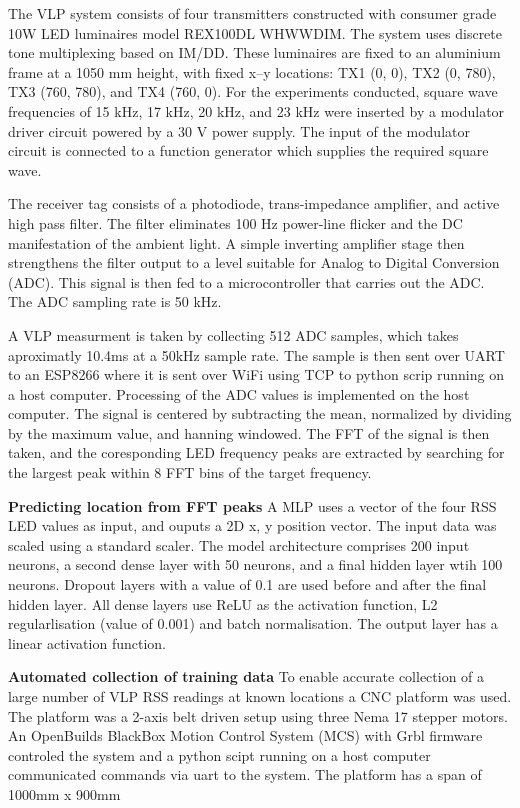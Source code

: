 The VLP system consists of four transmitters constructed with consumer grade 10W LED luminaires model REX100DL WHWWDIM. 
The system uses discrete tone multiplexing based on IM/DD.
These luminaires are fixed to an aluminium frame at a 1050 mm height, with fixed x–y locations: TX1 (0, 0), TX2 (0, 780), TX3 (760, 780), and TX4 (760, 0).
For the experiments conducted, square wave frequencies of 15 kHz, 17 kHz, 20 kHz, and 23 kHz were inserted by a modulator driver circuit powered by a 30 V power supply. 
The input of the modulator circuit is connected to a function generator which supplies the required square wave. 


The receiver tag consists of a photodiode, trans-impedance amplifier, and active high pass filter. 
The filter eliminates 100 Hz power-line flicker and the DC manifestation of the ambient light. 
A simple inverting amplifier stage then strengthens the filter output to a level suitable for Analog to Digital Conversion (ADC). 
This signal is then fed to a microcontroller that carries out the ADC. 
The ADC sampling rate is 50 kHz.

A VLP measurment is taken by collecting 512 ADC samples, which takes aproximatly 10.4ms at a 50kHz sample rate. 
The sample is then sent over UART to an ESP8266 where it is sent over WiFi using TCP to python scrip running on a host computer.
Processing of the ADC values is implemented on the host computer.
The signal is centered by subtracting the mean, normalized by dividing by the maximum value, and hanning windowed. 
The FFT of the signal is then taken, and the coresponding LED frequency peaks are extracted by searching for the largest peak within 8 FFT bins of the target frequency.


\textbf{Predicting location from FFT peaks}
A MLP uses a vector of the four RSS LED values as input, and ouputs a 2D x, y position vector. 
The input data was scaled using a standard scaler.
The model architecture comprises 200 input neurons, a second dense layer with 50 neurons, and a final hidden layer wtih 100 neurons. 
Dropout layers with a value of 0.1 are used before and after the final hidden layer.
All dense layers use ReLU as the activation function, L2 regularlisation (value of 0.001) and batch normalisation. 
The output layer has a linear activation function.


\textbf{Automated collection of training data}
To enable accurate collection of a large number of VLP RSS readings at known locations a CNC platform was used.
The platform was a 2-axis belt driven setup using three Nema 17 stepper motors.
An OpenBuilds BlackBox Motion Control System (MCS) with Grbl firmware controled the system and a python scipt running on a host computer communicated commands via uart to the system.
The platform has a span of 1000mm x 900mm

